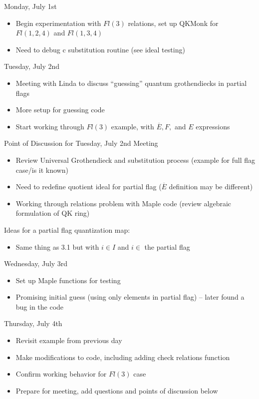Monday, July 1st
\begin{itemize}
    \item Begin experimentation with $Fl(3)$ relations, set up QKMonk for $Fl(1, 2, 4)$ and $Fl(1, 3, 4)$
    \item Need to debug c substitution routine (see ideal testing)
\end{itemize}

Tuesday, July 2nd
\begin{itemize}
    \item Meeting with Linda to discuss ``guessing'' quantum grothendiecks in partial flags
    \item More setup for guessing code
    \item Start working through $Fl(3)$ example, with $\overline{E}, F,$ and $E$ expressions
\end{itemize}

Point of Discussion for Tuesday, July 2nd Meeting
\begin{itemize}
    \item Review Universal Grothendieck and substitution process (example for full flag case/is it known)
    \item Need to redefine quotient ideal for partial flag ($\overline{E}$ definition may be different)
    \item Working through relations problem with Maple code (review algebraic formulation of QK ring)
\end{itemize}


Ideas for a partial flag quantization map:
\begin{itemize}
    \item Same thing as 3.1 but with $i \in I$ and $i \in $ the partial flag
\end{itemize}

Wednesday, July 3rd
\begin{itemize}
    \item Set up Maple functions for testing
    \item Promising initial guess (using only elements in partial flag) -- later found a bug in the code
\end{itemize}

Thursday, July 4th
\begin{itemize}
    \item Revisit example from previous day
    \item Make modifications to code, including adding check relations function
    \item Confirm working behavior for $Fl(3)$ case
    \item Prepare for meeting, add questions and points of discussion below
\end{itemize}

